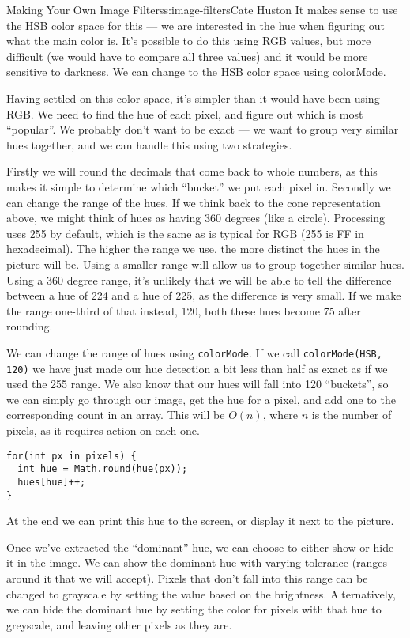 \begin{aosachapter}{Making Your Own Image Filters}{s:image-filters}{Cate Huston}
It makes sense to use the HSB color space for this --- we are interested
in the hue when figuring out what the main color is. It's possible to do
this using RGB values, but more difficult (we would have to compare all
three values) and it would be more sensitive to darkness. We can change
to the HSB color space using
\href{http://processing.org/reference/colorMode_.html}{colorMode}.

Having settled on this color space, it's simpler than it would have been
using RGB. We need to find the hue of each pixel, and figure out which
is most ``popular''. We probably don't want to be exact --- we want to
group very similar hues together, and we can handle this using two
strategies.

Firstly we will round the decimals that come back to whole numbers, as
this makes it simple to determine which ``bucket'' we put each pixel in.
Secondly we can change the range of the hues. If we think back to the
cone representation above, we might think of hues as having 360 degrees
(like a circle). Processing uses 255 by default, which is the same as is
typical for RGB (255 is FF in hexadecimal). The higher the range we use,
the more distinct the hues in the picture will be. Using a smaller range
will allow us to group together similar hues. Using a 360 degree range,
it's unlikely that we will be able to tell the difference between a hue
of 224 and a hue of 225, as the difference is very small. If we make the
range one-third of that instead, 120, both these hues become 75 after
rounding.

We can change the range of hues using \texttt{colorMode}. If we call
\texttt{colorMode(HSB, 120)} we have just made our hue detection a bit
less than half as exact as if we used the 255 range. We also know that
our hues will fall into 120 ``buckets'', so we can simply go through our
image, get the hue for a pixel, and add one to the corresponding count
in an array. This will be $O(n)$, where $n$ is the number of pixels, as
it requires action on each one.

\begin{verbatim}
for(int px in pixels) {
  int hue = Math.round(hue(px));
  hues[hue]++;
}
\end{verbatim}

At the end we can print this hue to the screen, or display it next to
the picture.

Once we've extracted the ``dominant'' hue, we can choose to either show
or hide it in the image. We can show the dominant hue with varying
tolerance (ranges around it that we will accept). Pixels that don't fall
into this range can be changed to grayscale by setting the value based
on the brightness. Alternatively, we can hide the dominant hue by
setting the color for pixels with that hue to greyscale, and leaving
other pixels as they are.


\end{aosachapter}
